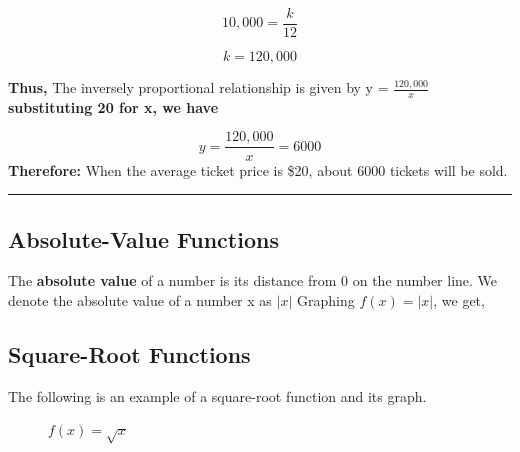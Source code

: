 \documentclass{report}
\begin{document}
$$ 10,000 = \frac{k}{12}$$

$$k = 120,000$$
\vspace{2.5mm}

\noindent\textbf{Thus,}
\bigbreak
The inversely proportional relationship is given by y = $\frac{120,000}{x}$
\bigbreak \bigbreak
\noindent \textbf{substituting 20 for x, we have}

$$y=\frac{120,000}{x} = 6000$$
\bigbreak \bigbreak
\noindent \textbf{Therefore:}
\bigbreak
When the average ticket price is \$20, about 6000 tickets will be sold.
\bigbreak \bigbreak
\hrule
\subsection{Absolute-Value Functions}
\bigbreak \noindent
The \textbf{absolute value}  of a number is its distance from 0 on the number line. We denote the absolute value of a number x as $\lvert x \rvert$
\bigbreak \bigbreak \noindent
Graphing $f(x) = \lvert x \rvert$, we get,
\bigbreak
\begin{center}
\end{center}

\pagebreak
\subsection{Square-Root Functions}
\bigbreak \noindent
The following is an example of a square-root function and its graph.
\bigbreak \noindent \bigbreak \noindent
\begin{figure}[htbp]
\begin{minipage}{0.4\textwidth}
  \hspace{20mm}$f(x) = \sqrt{x}$
\end{minipage}
\begin{minipage}{0.5\textwidth}
\end{minipage}
\end{figure}
\bigbreak \noindent \bigbreak \noindent 
\end{document}
